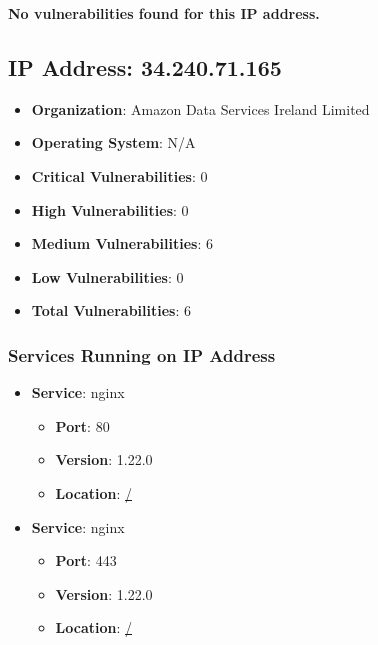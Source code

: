 \documentclass{article}
\begin{document}
\textbf{No vulnerabilities found for this IP address.}




\clearpage



\subsection{IP Address: 34.240.71.165}

\begin{itemize}
    \item \textbf{Organization}: Amazon Data Services Ireland Limited
    \item \textbf{Operating System}:  N/A 
    \item \textbf{Critical Vulnerabilities}: 0
    \item \textbf{High Vulnerabilities}: 0
    \item \textbf{Medium Vulnerabilities}: 6
    \item \textbf{Low Vulnerabilities}: 0
    \item \textbf{Total Vulnerabilities}: 6
\end{itemize}

\subsubsection*{Services Running on IP Address}

\begin{itemize}
    
        \item \textbf{Service}: nginx
        \begin{itemize}
            \item \textbf{Port}: 80
            \item \textbf{Version}:  1.22.0 
            \item \textbf{Location}: \href{ / }{ / }
        \end{itemize}
    
        \item \textbf{Service}: nginx
        \begin{itemize}
            \item \textbf{Port}: 443
            \item \textbf{Version}:  1.22.0 
            \item \textbf{Location}: \href{ / }{ / }
        \end{itemize}
    
\end{itemize}
\end{document}
